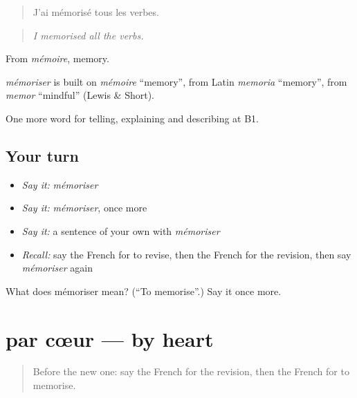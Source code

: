 \begin{quote}
J'ai mémorisé tous les verbes.
\end{quote}

\begin{quote}
\emph{I memorised all the verbs.}
\end{quote}

From \emph{mémoire}, memory.

\begin{cousinweb}
\emph{mémoriser} is built on \emph{mémoire} \textquotedblleft{}memory\textquotedblright{}, from Latin \emph{memoria} \textquotedblleft{}memory\textquotedblright{}, from \emph{memor} \textquotedblleft{}mindful\textquotedblright{} (Lewis \& Short).
\end{cousinweb}

\begin{grammarlens}[title={What you've built}]
One more word for telling, explaining and describing at B1.
\end{grammarlens}

\subsection*{Your turn}
\begin{itemize}
\raggedright
  \item \emph{Say it:} \emph{mémoriser}
  \item \emph{Say it:} \emph{mémoriser}, once more
  \item \emph{Say it:} a sentence of your own with \emph{mémoriser}
  \item \emph{Recall:} say the French for to revise, then the French for the revision, then say \emph{mémoriser} again
\end{itemize}

\begin{tcolorbox}[breakable,colback=teal!4,colframe=teal!35!black,title={Before you move on}]
What does mémoriser mean? (\textquotedblleft{}To memorise\textquotedblright{}.) Say it once more.
\end{tcolorbox}
\section[par cœur]{par cœur — by heart}

\label{lesson:FR-C377-par-coeur}



\begin{quote}
Before the new one: say the French for the revision, then the French for to memorise.
\end{quote}

